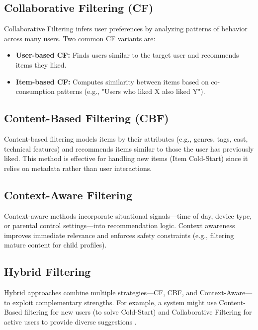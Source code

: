\subsection{Collaborative Filtering (CF)}

Collaborative Filtering infers user preferences by analyzing patterns of behavior across many users. Two common CF variants are:

\begin{itemize}

    \item \textbf{User-based CF:} Finds users similar to the target user and recommends items they liked.

    \item \textbf{Item-based CF:} Computes similarity between items based on co-consumption patterns (e.g., "Users who liked X also liked Y").

\end{itemize}



\subsection{Content-Based Filtering (CBF)}

Content-based filtering models items by their attributes (e.g., genres, tags, cast, technical features) and recommends items similar to those the user has previously liked. This method is effective for handling new items (Item Cold-Start) since it relies on metadata rather than user interactions.



\subsection{Context-Aware Filtering}

Context-aware methods incorporate situational signals—time of day, device type, or parental control settings—into recommendation logic. Context awareness improves immediate relevance and enforces safety constraints (e.g., filtering mature content for child profiles).



\subsection{Hybrid Filtering}

Hybrid approaches combine multiple strategies—CF, CBF, and Context-Aware—to exploit complementary strengths. For example, a system might use Content-Based filtering for new users (to solve Cold-Start) and Collaborative Filtering for active users to provide diverse suggestions \cite{ref:hybrid_survey}.



